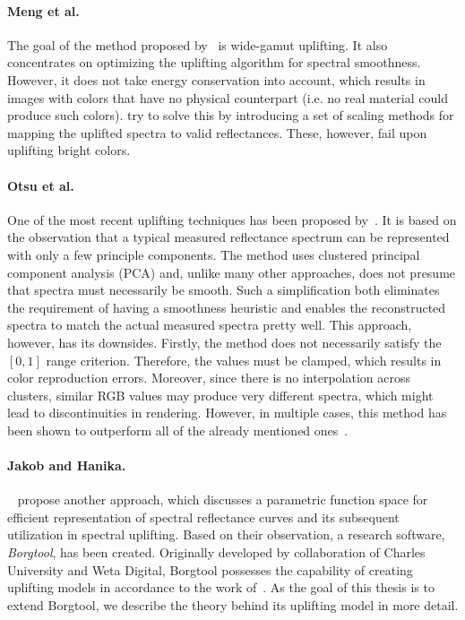 \paragraph{Meng et al.} The goal of the method proposed by~\citet{upsamplingMeng} is wide-gamut uplifting. It also concentrates on optimizing the uplifting algorithm for spectral smoothness. However, it does not take energy conservation into account, which results in images with colors that have no physical counterpart (i.e. no real material could produce such colors). \citet{upsamplingMeng} try to solve this by introducing a set of scaling methods for mapping the uplifted spectra to valid reflectances. These, however, fail upon uplifting bright colors. 

\paragraph{Otsu et al.} One of the most recent uplifting techniques has been proposed by~\citet{upsamplingOtsu}. It is based on the observation that a typical measured reflectance spectrum can be represented with only a few principle components. The method uses clustered principal component analysis (PCA) and, unlike many other approaches, does not presume that spectra must necessarily be smooth. Such a simplification both eliminates the requirement of having a smoothness heuristic and enables the reconstructed spectra to match the actual measured spectra pretty well. This approach, however, has its downsides. Firstly, the method does not necessarily satisfy the $[0,1]$ range criterion. Therefore, the values must be clamped, which results in color reproduction errors. Moreover, since there is no interpolation across clusters, similar RGB values may produce very different spectra, which might lead to discontinuities in rendering. However, in multiple cases, this method has been shown to outperform all of the already mentioned ones~\cite{upsamplingJakobHanika}.

\paragraph{Jakob and Hanika.}~\citet{upsamplingJakobHanika} propose another approach, which discusses a parametric function space for efficient representation of spectral reflectance curves and its subsequent utilization in spectral uplifting. Based on their observation, a research software, \emph{Borgtool}, has been created. Originally developed by collaboration of Charles University and Weta Digital, Borgtool possesses the capability of creating uplifting models in accordance to the work of~\citet{upsamplingJakobHanika}. As the goal of this thesis is to extend Borgtool, we describe the theory behind its uplifting model in more detail.

